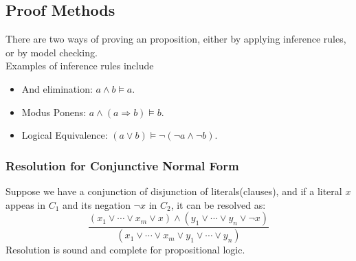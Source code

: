 \documentclass[12pt]{article}
\theoremstyle{definition}
\begin{document}
\subsection{Proof Methods}
There are two ways of proving an proposition, either by applying inference rules, or by model checking.\\
Examples of inference rules include 
\begin{itemize}
	\item And elimination: $a\land b\models a$.
	\item Modus Ponens: $a\land (a\Rightarrow b)\models b$.
	\item Logical Equivalence: $(a\lor b)\models \neg(\neg a\land \neg b)$.
\end{itemize}
\subsubsection{Resolution for Conjunctive Normal Form}
Suppose we have a conjunction of disjunction of literals(clauses), and if a literal $x$ appeas in $C_1$ and its negation $\neg x$ in $C_2$, it can be resolved as:
\[
\frac{(x_1\lor \cdots \lor x_m\lor x)\land (y_1\lor \cdots \lor y_n\lor \neg x)}{(x_1\lor \cdots \lor x_m\lor y_1\lor \cdots \lor y_n)}
\]
Resolution is sound and complete for propositional logic.
\end{document}
